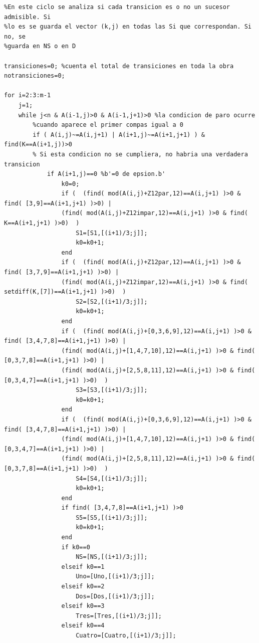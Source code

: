 \documentclass[letterpaper,12pt]{book}
\theoremstyle{definition} \newtheorem{Def}{Definición}[chapter]
\theoremstyle{definition} \newtheorem{Teo}{Teorema}[chapter]
\theoremstyle{definition} \newtheorem{Pro}{Proposición}[chapter]
\theoremstyle{definition} \newtheorem{Lema}{Lema}[chapter]
\begin{document}
{\begin{verbatim}
%En este ciclo se analiza si cada transicion es o no un sucesor admisible. Si
%lo es se guarda el vector (k,j) en todas las Si que correspondan. Si no, se 
%guarda en NS o en D

transiciones=0; %cuenta el total de transiciones en toda la obra
notransiciones=0;

for i=2:3:m-1
    j=1;
    while j<n & A(i-1,j)>0 & A(i-1,j+1)>0 %la condicion de paro ocurre
        %cuando aparece el primer compas igual a 0
        if ( A(i,j)~=A(i,j+1) | A(i+1,j)~=A(i+1,j+1) ) & find(K==A(i+1,j))>0
        % Si esta condicion no se cumpliera, no habria una verdadera transicion 
            if A(i+1,j)==0 %b'=0 de epsion.b'
                k0=0; 
                if (  (find( mod(A(i,j)+Z12par,12)==A(i,j+1) )>0 & find( [3,9]==A(i+1,j+1) )>0) | 
                (find( mod(A(i,j)+Z12impar,12)==A(i,j+1) )>0 & find( K==A(i+1,j+1) )>0)  )
                    S1=[S1,[(i+1)/3;j]];
                    k0=k0+1;
                end    
                if (  (find( mod(A(i,j)+Z12par,12)==A(i,j+1) )>0 & find( [3,7,9]==A(i+1,j+1) )>0) | 
                (find( mod(A(i,j)+Z12impar,12)==A(i,j+1) )>0 & find( setdiff(K,[7])==A(i+1,j+1) )>0)  )
                    S2=[S2,[(i+1)/3;j]];
                    k0=k0+1;
                end    
                if (  (find( mod(A(i,j)+[0,3,6,9],12)==A(i,j+1) )>0 & find( [3,4,7,8]==A(i+1,j+1) )>0) | 
                (find( mod(A(i,j)+[1,4,7,10],12)==A(i,j+1) )>0 & find( [0,3,7,8]==A(i+1,j+1) )>0) | 
                (find( mod(A(i,j)+[2,5,8,11],12)==A(i,j+1) )>0 & find( [0,3,4,7]==A(i+1,j+1) )>0)  ) 
                    S3=[S3,[(i+1)/3;j]];
                    k0=k0+1;   
                end
                if (  (find( mod(A(i,j)+[0,3,6,9],12)==A(i,j+1) )>0 & find( [3,4,7,8]==A(i+1,j+1) )>0) | 
                (find( mod(A(i,j)+[1,4,7,10],12)==A(i,j+1) )>0 & find( [0,3,4,7]==A(i+1,j+1) )>0) | 
                (find( mod(A(i,j)+[2,5,8,11],12)==A(i,j+1) )>0 & find( [0,3,7,8]==A(i+1,j+1) )>0)  ) 
                    S4=[S4,[(i+1)/3;j]];
                    k0=k0+1;
                end
                if find( [3,4,7,8]==A(i+1,j+1) )>0
                    S5=[S5,[(i+1)/3;j]];
                    k0=k0+1;       
                end    
                if k0==0
                    NS=[NS,[(i+1)/3;j]];
                elseif k0==1
                    Uno=[Uno,[(i+1)/3;j]];
                elseif k0==2
                    Dos=[Dos,[(i+1)/3;j]]; 
                elseif k0==3
                    Tres=[Tres,[(i+1)/3;j]];
                elseif k0==4
                    Cuatro=[Cuatro,[(i+1)/3;j]];

\end{verbatim}}
\end{document}
